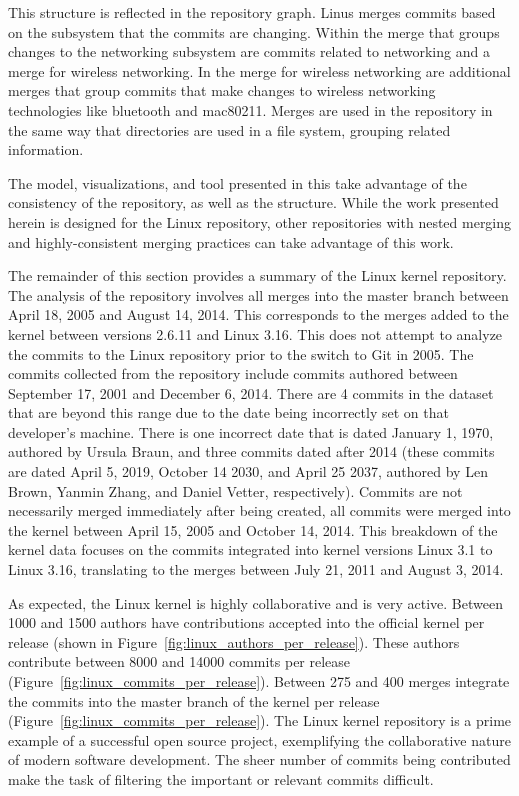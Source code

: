 This structure is reflected in the repository graph.
Linus merges commits based on the subsystem that the commits are changing.
Within the merge that groups changes to the networking subsystem are
commits related to networking and a merge for wireless networking.
In the merge for wireless networking are additional merges that group
commits that make changes to wireless networking technologies like
bluetooth and mac80211.
Merges are used in the repository in the same way that directories are
used in a file system, grouping related information.

The model, visualizations, and tool presented in this \paper{} take
advantage of the consistency of the repository, as well as the
structure.
While the work presented herein is designed for the Linux repository,
other repositories with nested merging and highly-consistent merging
practices can take advantage of this work.

The remainder of this section provides a summary of the Linux kernel
repository.
The analysis of the repository involves all merges into the master
branch between April 18, 2005 and August 14, 2014.
This corresponds to the merges added to the kernel between versions
2.6.11 and Linux 3.16.
This \paper{} does not attempt to analyze the commits to the Linux
repository prior to the switch to Git in 2005.
The commits collected from the repository include commits authored
between September 17, 2001 and December 6, 2014.
There are 4 commits in the dataset that are beyond this range due to
the date being incorrectly set on that developer's machine.
There is one incorrect date that is dated January 1, 1970, authored by
Ursula Braun, and three commits dated after 2014
(these commits are dated April 5, 2019, October 14 2030, and
April 25 2037, authored by Len Brown, Yanmin Zhang, and Daniel Vetter,
respectively).
Commits are not necessarily merged immediately after being created,
all commits were merged into the kernel between April 15, 2005 and
October 14, 2014.
This breakdown of the kernel data focuses on the commits integrated
into kernel versions Linux 3.1 to Linux 3.16, translating to the merges
between July 21, 2011 and August 3, 2014.

As expected, the Linux kernel is highly collaborative and is very
active. Between 1000 and 1500 authors have contributions accepted into
the official kernel per release (shown in
Figure~\ref{fig:linux_authors_per_release}).
These authors contribute between 8000 and 14000 commits per release
(Figure~\ref{fig:linux_commits_per_release}).
Between 275 and 400 merges integrate the commits into the master branch
of the kernel per release (Figure~\ref{fig:linux_commits_per_release}).
The Linux kernel repository is a prime example of a successful open
source project, exemplifying the collaborative nature of modern software
development.
The sheer number of commits being contributed make the task
of filtering the important or relevant commits difficult.

